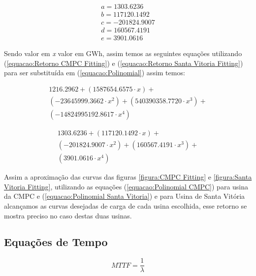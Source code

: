 \documentclass[conference]{IEEEtran}
\begin{document}
\begin{equation}
\begin{split}
\label{equacao:Retorno Santa Vitoria Fitting}
a = 1303.6236\\
b = 117120.1492\\
c = -201824.9007\\
d = 160567.4191\\
e = 3901.0616
\end{split}
\end{equation}

Sendo valor em \textit{x} valor em GWh, assim temos as seguintes equações utilizando (\ref{equacao:Retorno CMPC Fitting}) e (\ref{equacao:Retorno Santa Vitoria Fitting}) para ser substituída em (\ref{equacao:Polinomial}) assim temos:

\begin{equation}
\begin{split}
\label{equacao:Polinomial CMPC}
1216.2962 + (1587654.6575 \cdot x) + \\ (-23645999.3662 \cdot x^{2}) + (540390358.7720 \cdot x^{3}) +\\ (-14824995192.8617 \cdot x^{4})
\end{split}
\end{equation}

\begin{equation}
\begin{split}
\label{equacao:Polinomial Santa Vitoria}
1303.6236 + (117120.1492 \cdot x) + \\ (-201824.9007 \cdot x^{2}) + (160567.4191 \cdot x^{3}) +\\ (3901.0616 \cdot x^{4})
\end{split}
\end{equation}

Assim a aproximação das curvas das figuras \ref{figura:CMPC Fitting} e \ref{figura:Santa Vitoria Fitting}, utilizando as equações (\ref{equacao:Polinomial CMPC}) para usina da CMPC e (\ref{equacao:Polinomial Santa Vitoria}) e para Usina de Santa Vitória alcançamos as curvas desejadas de carga de cada usina escolhida, esse retorno se mostra preciso no caso destas duas usinas.

\subsection{Equações de Tempo}

\begin{equation}
\label{equacao:MTTF}
MTTF =\frac{1}{\lambda}
\end{equation}
\end{document}
